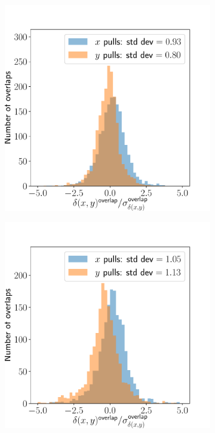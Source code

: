 \documentclass{article}
\begin{document}
\begin{figure}[ht]
\begin{subfigure}{0.24\linewidth}
		\caption{}
		\label{fig:stitchpull11}
	\end{subfigure}
	\begin{subfigure}{0.24\linewidth}
		\includegraphics[width=\linewidth]{stitch-pull-4-2.pdf}
		\caption{}
		\label{fig:stitchpull42}
	\end{subfigure}
	\begin{subfigure}{0.24\linewidth}
		\includegraphics[width=\linewidth]{stitch-pull-3-2.pdf}

\end{subfigure}
\end{figure}
\end{document}
